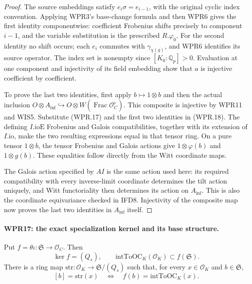 \documentclass[11pt,a4paper]{article}
\numberwithin{equation}{section}
\theoremstyle{remark}\newtheorem{remark}[theorem]{Remark}
\begin{document}
\begin{proof}
The source embeddings satisfy $e_i\sigma=e_{i-1}$, with the
original cyclic index convention. Applying WPR3's base-change
formula and then WPR6 gives the first identity componentwise:
coefficient Frobenius shifts precisely to component $i-1$,
and the variable substitution is the prescribed $R.\varphi_0$.
For the second identity no shift occurs; each $e_i$ commutes
with $\gamma_{\chi(g)}$, and WPR6 identifies its source operator.
The index set is nonempty since $[K_0:\mathbb Q_p]>0$.
Evaluation at one component and injectivity of its field embedding
show that $a$ is injective coefficient by coefficient.

To prove the last two identities, first apply
$b\mapsto1\otimes b$ and then the actual inclusion
$O\otimes A_{\mathrm{inf}}\hookrightarrow O\otimes W(\operatorname{Frac}
\mathcal O_C^\flat)$. This composite is injective by WPR11
and WIS5. Substitute (WPR.17) and the first two identities in
(WPR.18). The defining $I.\mathrm{ioE}$ Frobenius and Galois
compatibilities, together with its extension of $I.\mathrm{io}$,
make the two resulting expressions equal in that tensor ring.
On a pure tensor $1\otimes b$, the tensor Frobenius and Galois
actions give $1\otimes\varphi(b)$ and $1\otimes g(b)$.
These equalities follow directly from the Witt coordinate maps.

The Galois action specified by $AI$ is the same action used here:
its required compatibility with every inverse-limit coordinate
determines the tilt action uniquely, and Witt functoriality then
determines its action on $A_{\mathrm{inf}}$. This is also the coordinate
equivariance checked in IFD8. Injectivity of the composite map
now proves the last two identities in $A_{\mathrm{inf}}$ itself.
\end{proof}

\paragraph{WPR17: the exact specialization kernel and its base structure.}
\label{claim:WPR17}
Put $f=\theta\iota:\mathfrak S\to\mathcal O_C$.
Then
\[
 \ker f=(Q_s),\qquad
 \mathrm{intToOC}_K(\mathcal O_K)\subset f(\mathfrak S).
 \tag{WPR.19}
\]
There is a ring map
$\mathrm{str}:\mathcal O_K\to\mathfrak S/(Q_s)$ such that,
for every $x\in\mathcal O_K$ and $b\in\mathfrak S$,
\[
 [b]=\mathrm{str}(x)
       \quad\Longleftrightarrow\quad f(b)=\mathrm{intToOC}_K(x).
 \tag{WPR.20}
\]
\end{document}
